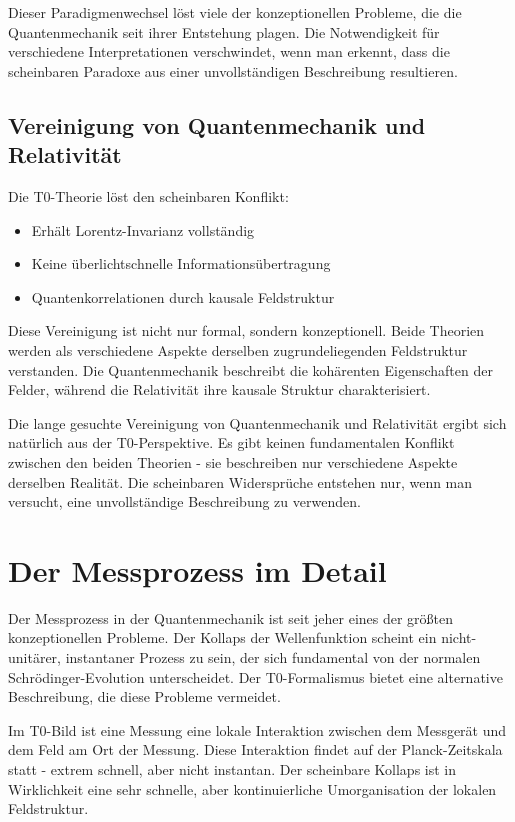 \documentclass[12pt,a4paper]{article}
\begin{document}
	Dieser Paradigmenwechsel löst viele der konzeptionellen Probleme, die die Quantenmechanik seit ihrer Entstehung plagen. Die Notwendigkeit für verschiedene Interpretationen verschwindet, wenn man erkennt, dass die scheinbaren Paradoxe aus einer unvollständigen Beschreibung resultieren.
	
	\subsection{Vereinigung von Quantenmechanik und Relativität}
	
	Die T0-Theorie löst den scheinbaren Konflikt:
	\begin{itemize}
		\item Erhält Lorentz-Invarianz vollständig
		\item Keine überlichtschnelle Informationsübertragung
		\item Quantenkorrelationen durch kausale Feldstruktur
	\end{itemize}
	
	Diese Vereinigung ist nicht nur formal, sondern konzeptionell. Beide Theorien werden als verschiedene Aspekte derselben zugrundeliegenden Feldstruktur verstanden. Die Quantenmechanik beschreibt die kohärenten Eigenschaften der Felder, während die Relativität ihre kausale Struktur charakterisiert.
	
	Die lange gesuchte Vereinigung von Quantenmechanik und Relativität ergibt sich natürlich aus der T0-Perspektive. Es gibt keinen fundamentalen Konflikt zwischen den beiden Theorien - sie beschreiben nur verschiedene Aspekte derselben Realität. Die scheinbaren Widersprüche entstehen nur, wenn man versucht, eine unvollständige Beschreibung zu verwenden.
	
	\section{Der Messprozess im Detail}
	
	Der Messprozess in der Quantenmechanik ist seit jeher eines der größten konzeptionellen Probleme. Der Kollaps der Wellenfunktion scheint ein nicht-unitärer, instantaner Prozess zu sein, der sich fundamental von der normalen Schrödinger-Evolution unterscheidet. Der T0-Formalismus bietet eine alternative Beschreibung, die diese Probleme vermeidet.
	
	Im T0-Bild ist eine Messung eine lokale Interaktion zwischen dem Messgerät und dem Feld am Ort der Messung. Diese Interaktion findet auf der Planck-Zeitskala statt - extrem schnell, aber nicht instantan. Der scheinbare Kollaps ist in Wirklichkeit eine sehr schnelle, aber kontinuierliche Umorganisation der lokalen Feldstruktur.
	
\end{document}
